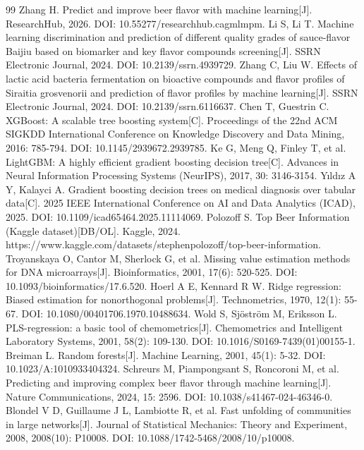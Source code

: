 \documentclass[zihao=-4,a4paper,UTF8,fontset=none]{ctexart}
\begin{document}
\begin{thebibliography}{99}
\begingroup{}\linespread{1.12}\selectfont\setlength{\bibsep}{3pt}
\setlength{\itemsep}{0pt}\setlength{\parskip}{0pt}\setlength{\parsep}{0pt}
\setlength{\emergencystretch}{2em}
 Zhang H. Predict and improve beer flavor with machine learning[J]. ResearchHub, 2026. DOI: 10.55277/researchhub.cagmlmpm.
 Li S, Li T. Machine learning discrimination and prediction of different quality grades of sauce-flavor Baijiu based on biomarker and key flavor compounds screening[J]. SSRN Electronic Journal, 2024. DOI: 10.2139/ssrn.4939729.
 Zhang C, Liu W. Effects of lactic acid bacteria fermentation on bioactive compounds and flavor profiles of Siraitia grosvenorii and prediction of flavor profiles by machine learning[J]. SSRN Electronic Journal, 2024. DOI: 10.2139/ssrn.6116637.
 Chen T, Guestrin C. XGBoost: A scalable tree boosting system[C]. Proceedings of the 22nd ACM SIGKDD International Conference on Knowledge Discovery and Data Mining, 2016: 785-794. DOI: 10.1145/2939672.2939785.
 Ke G, Meng Q, Finley T, et al. LightGBM: A highly efficient gradient boosting decision tree[C]. Advances in Neural Information Processing Systems (NeurIPS), 2017, 30: 3146-3154.
 Yıldız A Y, Kalayci A. Gradient boosting decision trees on medical diagnosis over tabular data[C]. 2025 IEEE International Conference on AI and Data Analytics (ICAD), 2025. DOI: 10.1109/icad65464.2025.11114069.
 Polozoff S. Top Beer Information (Kaggle dataset)[DB/OL]. Kaggle, 2024. https://www.kaggle.com/datasets/\allowbreak{}stephenpolozoff/\allowbreak{}top-beer-information.
 Troyanskaya O, Cantor M, Sherlock G, et al. Missing value estimation methods for DNA microarrays[J]. Bioinformatics, 2001, 17(6): 520-525. DOI: 10.1093/bioinformatics/17.6.520.
 Hoerl A E, Kennard R W. Ridge regression: Biased estimation for nonorthogonal problems[J]. Technometrics, 1970, 12(1): 55-67. DOI: 10.1080/00401706.1970.10488634.
 Wold S, Sjöström M, Eriksson L. PLS-regression: a basic tool of chemometrics[J]. Chemometrics and Intelligent Laboratory Systems, 2001, 58(2): 109-130. DOI: 10.1016/S0169-7439(01)00155-1.
 Breiman L. Random forests[J]. Machine Learning, 2001, 45(1): 5-32. DOI: 10.1023/A:1010933404324.
 Schreurs M, Piampongsant S, Roncoroni M, et al. Predicting and improving complex beer flavor through machine learning[J]. Nature Communications, 2024, 15: 2596. DOI: 10.1038/s41467-024-46346-0.
 Blondel V D, Guillaume J L, Lambiotte R, et al. Fast unfolding of communities in large networks[J]. Journal of Statistical Mechanics: Theory and Experiment, 2008, 2008(10): P10008. DOI: 10.1088/1742-5468/2008/10/p10008.

\end{thebibliography}
\end{document}
